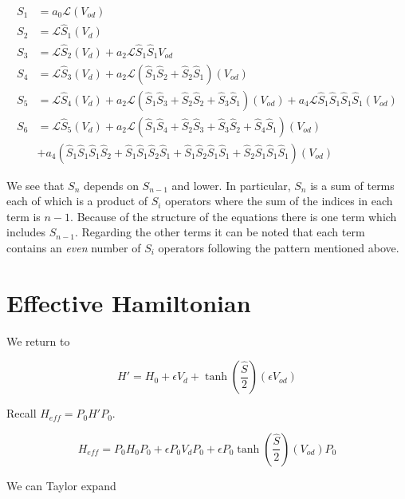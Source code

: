 \documentclass[12pt]{article}
\begin{document}
\begin{equation}
\begin{split}
S_1 &= a_0\mathcal{L}(V_{od})\\
S_2 &= \mathcal{L}\hat{S}_1(V_d)\\
S_3 &= \mathcal{L}\hat{S}_2(V_d) + a_2 \mathcal{L}\hat{S}_1\hat{S}_1V_{od}\\
S_4 &= \mathcal{L}\hat{S}_3(V_d) + a_2 \mathcal{L}(\hat{S}_1\hat{S}_2 + \hat{S}_2\hat{S}_1)(V_{od})\\
S_5 &= \mathcal{L}\hat{S}_4(V_d) + a_2 \mathcal{L}(\hat{S}_1\hat{S}_3 + \hat{S}_2\hat{S}_2 + \hat{S}_3\hat{S}_1)(V_{od}) + a_4 \mathcal{L}\hat{S}_1\hat{S}_1\hat{S}_1\hat{S}_1(V_{od})\\
S_6 &= \mathcal{L}\hat{S}_5(V_d) + a_2 \mathcal{L}(\hat{S}_1\hat{S}_4 + \hat{S}_2\hat{S}_3 + \hat{S}_3\hat{S}_2 + \hat{S}_4\hat{S}_1)(V_{od})\\
&+ a_4(\hat{S}_1\hat{S}_1\hat{S}_1\hat{S}_2 + \hat{S}_1\hat{S}_1\hat{S}_2\hat{S}_1 + \hat{S}_1\hat{S}_2\hat{S}_1\hat{S}_1 + \hat{S}_2\hat{S}_1\hat{S}_1\hat{S}_1)(V_{od})
\end{split}
\end{equation}

We see that $S_{n}$ depends on $S_{n-1}$ and lower. In particular, $S_n$ is a sum of terms each of which is a product of $S_i$ operators where the sum of the indices in each term is $n-1$. Because of the structure of the equations there is one term which includes $S_{n-1}$. Regarding the other terms it can be noted that each term contains an \textit{even} number of $S_i$ operators following the pattern mentioned above.

\section{Effective Hamiltonian}

We return to

\begin{equation}
H' = H_0 + \epsilon V_d + \tanh\left(\frac{\hat{S}}{2} \right)(\epsilon V_{od})
\end{equation}

Recall $H_{eff} = P_0 H' P_0$.

\begin{equation}
H_{eff} = P_0H_0P_0 + \epsilon P_0V_dP_0 + \epsilon P_0 \tanh\left(\frac{\hat{S}}{2}\right)(V_{od})P_0
\end{equation}

We can Taylor expand
\end{document}
